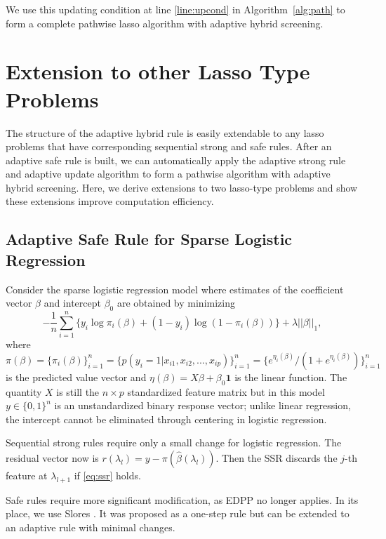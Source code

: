 We use this updating condition at line \ref{line:upcond} in Algorithm~\ref{alg:path} to form a complete pathwise lasso algorithm with adaptive hybrid screening. 

\section{Extension to other Lasso Type Problems}
\label{sec:extension}

The structure of the adaptive hybrid rule is easily extendable to any lasso problems that have corresponding sequential strong and safe rules. After an adaptive safe rule is built, we can automatically apply the adaptive strong rule and adaptive update algorithm to form a pathwise algorithm with adaptive hybrid screening. Here, we derive extensions to two lasso-type problems and show these extensions improve computation efficiency.

\subsection{Adaptive Safe Rule for Sparse Logistic Regression}
\label{sec:logis}

Consider the sparse logistic regression model where estimates of the coefficient vector $\beta$ and intercept $\beta_0$ are obtained by minimizing
\begin{equation}
    \label{eq:logis}
  -\frac{1}{n} \sum_{i=1}^n \big\{y_i\log\pi_i(\beta) + (1-y_i)\log(1 -\pi_i(\beta))\big\} + \lambda||\beta||_1,
\end{equation}
where $\pi(\beta)=\{\pi_i(\beta)\}_{i=1}^n=\{p(y_i=1|x_{i1},x_{i2},...,x_{ip})\}_{i=1}^n=\{e^{\eta_i(\beta)}/(1+e^{\eta_i(\beta)})\}_{i=1}^n$ is the predicted value vector and $\eta(\beta)=X\beta+\beta_0\mathbf{1}$ is the linear function. The quantity $X$ is still the $n\times p$ standardized feature matrix but in this model $y\in\{0,1\}^n$ is an unstandardized binary response vector; unlike linear regression, the intercept cannot be eliminated through centering in logistic regression.

Sequential strong rules require only a small change for logistic regression. The residual vector now is $r(\lambda_l)=y-\pi(\hat{\beta}(\lambda_l))$. Then the SSR discards the $j$-th feature at $\lambda_{l+1}$ if \eqref{eq:ssr} holds.

Safe rules require more significant modification, as EDPP no longer applies. In its place, we use Slores \citep[sparse logistic regression screening rule,][]{wang2014safe}. It was proposed as a one-step rule but can be extended to an adaptive rule with minimal changes. 

